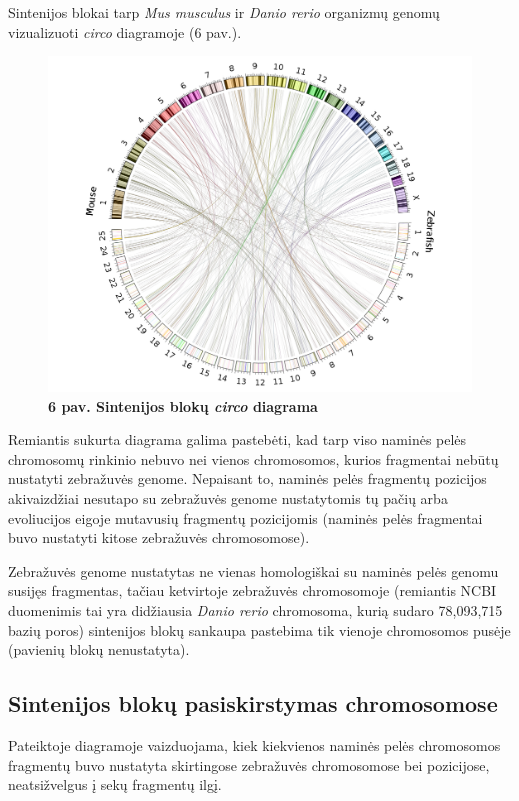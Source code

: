 \documentclass[12pt]{article}
\begin{document}
Sintenijos blokai tarp \emph{Mus musculus} ir \emph{Danio rerio} organizmų
genomų vizualizuoti \emph{circo} diagramoje (6 pav.).

\begin{figure}[htb]
    \begin{center}
        \includegraphics[width=0.8\linewidth]{../Figures/SynCircos.png}
        \vspace{-1\baselineskip}
        \caption*{\small\textbf{6 pav. Sintenijos blokų \emph{circo}
        diagrama}}
        \label{fig:birds}
    \end{center}
\end{figure}

Remiantis sukurta diagrama galima pastebėti, kad tarp viso naminės pelės
chromosomų rinkinio nebuvo nei vienos chromosomos, kurios fragmentai nebūtų
nustatyti zebražuvės genome. Nepaisant to, naminės pelės fragmentų
pozicijos akivaizdžiai nesutapo su zebražuvės genome nustatytomis tų pačių
arba evoliucijos eigoje mutavusių fragmentų pozicijomis (naminės pelės
fragmentai buvo nustatyti kitose zebražuvės chromosomose).

Zebražuvės genome nustatytas ne vienas homologiškai su naminės pelės genomu
susijęs fragmentas, tačiau ketvirtoje zebražuvės chromosomoje (remiantis
NCBI\cite{NCBI} duomenimis tai yra didžiausia \emph{Danio rerio} chromosoma,
kurią sudaro 78,093,715 bazių poros) sintenijos blokų sankaupa pastebima
tik vienoje chromosomos pusėje (pavienių blokų nenustatyta).

\subsection{Sintenijos blokų pasiskirstymas chromosomose}
Pateiktoje diagramoje vaizduojama, kiek kiekvienos naminės pelės chromosomos
fragmentų buvo nustatyta skirtingose zebražuvės chromosomose bei pozicijose,
neatsižvelgus į sekų fragmentų ilgį.
\end{document}
